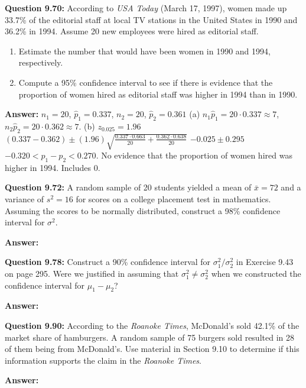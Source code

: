 \documentclass{article}
\begin{document}
\textbf{Question 9.70:}
According to \textit{USA Today} (March 17, 1997),
women made up 33.7\% of the editorial staff at local
TV stations in the United States in 1990 and 36.2\% in
1994. Assume 20 new employees were hired as editorial
staff.
\begin{enumerate}[label = (\alph*) ]
    \item Estimate the number that would have been women
    in 1990 and 1994, respectively.
    \item  Compute a 95\% confidence interval to see if there
    is evidence that the proportion of women hired as
    editorial staff was higher in 1994 than in 1990.
\end{enumerate}
\begin{description}
    \item \textbf{Answer:} $n_1=20$, $\hat{p}_1=0.337$, $n_2=20$, $\hat{p}_2=0.361$\newline
    (a) $n_1\hat{p}_1=20\cdot 0.337 \approx 7$, $n_2\hat{p}_2=20\cdot 0.362\approx 7$.\newline
    (b) $z_{0.025}=1.96$\newline
    $(0.337-0.362)\pm(1.96)\sqrt{\frac{0.337\cdot 0.663}{20}+\frac{0.362\cdot 0.638}{20}}$\newline
    $-0.025\pm 0.295$\newline
    \boldmath$-0.320<p_1-p_2<0.270$. No evidence that the proportion of women hired was higher in 1994.
    Includes 0.
\end{description}

\textbf{Question 9.72:}
A random sample of 20 students yielded a mean
of $\bar{x} = 72$ and a variance of $s^2 = 16$ for scores on a
college placement test in mathematics. Assuming the
scores to be normally distributed, construct a 98\% 
confidence interval for $\sigma^2$.
\begin{description}
    \item \textbf{Answer:} 
\end{description}

\textbf{Question 9.78:}
Construct a 90\% confidence interval for $\sigma^2_1 / \sigma^2_2$ 
in Exercise 9.43 on page 295. Were we justified in assuming that 
$\sigma^2_1 \not= \sigma^2_2$ when we constructed the confidence
interval for $\mu_1 − \mu_2$?
\begin{description}
    \item \textbf{Answer:} 
\end{description}

\textbf{Question 9.90:}
According to the \textit{Roanoke Times}, McDonald’s
sold 42.1\% of the market share of hamburgers. A random 
sample of 75 burgers sold resulted in 28 of them
being from McDonald’s. Use material in Section 9.10
to determine if this information supports the claim in
the \textit{Roanoke Times}.
\begin{description}
    \item \textbf{Answer:} 
\end{description}
\end{document}
